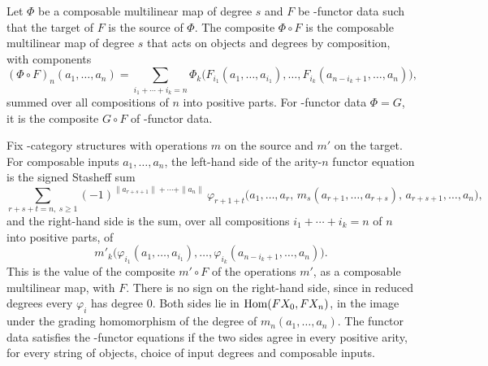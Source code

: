 \begin{definition}
\label{AInfinityTheory.ComposableMultilinearMap.comp}
\leanok
{}
Let $\Phi$ be a composable multilinear map of degree $s$ and $F$ be \Ainf{}-functor data such
that the target of $F$ is the source of $\Phi$. The composite $\Phi \circ F$ is the composable
multilinear map of degree $s$ that acts on objects and degrees by composition, with components
\[
  (\Phi \circ F)_n(a_1,\dots,a_n) = \sum_{i_1 + \cdots + i_k = n}
  \Phi_k\bigl(F_{i_1}(a_1,\dots,a_{i_1}),\dots,F_{i_k}(a_{n-i_k+1},\dots,a_n)\bigr),
\]
summed over all compositions of $n$ into positive parts. For \Ainf{}-functor data $\Phi = G$, it
is the composite $G \circ F$ of \Ainf{}-functor data.
\end{definition}

\begin{definition}
\label{AInfinityTheory.AInfinityFunctor.mapCompSum_eq_compMapSum}
\leanok
{}
Fix \Ainf{}-category structures with operations $m$ on the source and $m'$ on the target. For composable
inputs $a_1,\dots,a_n$, the left-hand side of the arity-$n$ functor equation is
the signed Stasheff sum
\[
  \sum_{r+s+t=n,\ s\geq 1} (-1)^{\|a_{r+s+1}\| + \cdots + \|a_n\|}\,
  \varphi_{r+1+t}\bigl(a_1,\dots,a_r,\, m_s(a_{r+1},\dots,a_{r+s}),\, a_{r+s+1},\dots,a_n\bigr),
\]
and the right-hand side is the sum, over all compositions $i_1 + \cdots + i_k = n$
of $n$ into positive parts, of
\[
  m'_k\bigl(\varphi_{i_1}(a_1,\dots,a_{i_1}),\dots,\varphi_{i_k}(a_{n-i_k+1},\dots,a_n)\bigr).
\]
This is the value of the composite $m' \circ F$ of the operations $m'$, as a composable
multilinear map, with $F$. There is no sign on the right-hand side, since in reduced degrees every
$\varphi_i$ has degree $0$. Both sides lie in $\operatorname{Hom}(FX_0,FX_n)$, in the image under
the grading homomorphism of the degree of $m_n(a_1,\dots,a_n)$. The functor data satisfies the
\Ainf{}-functor equations if the two sides agree in every positive arity, for
every string of objects, choice of input degrees and composable inputs.
\end{definition}

